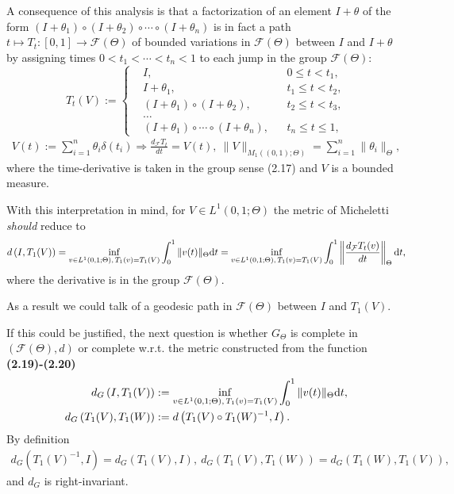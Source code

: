 \documentclass{book}
\numberwithin{equation}{section}
\begin{document}
\begin{enumerate}
    A consequence of this analysis is that a factorization of an element $I + \theta$ of the form $(I + \theta_1)\circ(I + \theta_2)\circ\cdots\circ(I + \theta_n)$ is in fact a path $t\mapsto T_t:[0,1]\to\mathcal{F}(\Theta)$ of bounded variations in $\mathcal{F}(\Theta)$ between $I$ and $I + \theta$ by assigning times $0 < t_1 < \cdots < t_n < 1$ to each jump in the group $\mathcal{F}(\Theta)$:
    \begin{equation*}
        T_t(V) := \left\{\begin{split}
            &I, &&0\le t < t_1,\\
            &I + \theta_1, &&t_1\le t < t_2,\\
            &(I + \theta_1)\circ(I + \theta_2), && t_2\le t < t_3,\\
            &\ldots\\
            &(I + \theta_1)\circ\cdots\circ(I + \theta_n), &&t_n\le t\le 1,
        \end{split}\right.
    \end{equation*}
    \begin{align*}
        V(t) := \sum_{i=1}^n 
        \theta_i\delta(t_i)\Rightarrow\frac{d_{\mathcal{F}}T_t}{dt} = V(t),\ \|V\|_{M_1\left((0,1);\Theta\right)} = \sum_{i=1}^n \|\theta_i\|_\Theta,
    \end{align*}
    where the time-derivative is taken in the group sense (2.17) and $V$ is a bounded measure.
    
    With this interpretation in mind, for $V\in L^1(0,1;\Theta)$ the metric of Micheletti \textit{should} reduce to
    \begin{align*}
        d\left(I,T_1(V)\right) = \inf_{v\in L^1(0,1;\Theta),\,T_1(v) = T_1(V)} \int_0^1 \|v(t)\|_\Theta{\rm d}t = \inf_{v\in L^1(0,1;\Theta),\,T_1(v) = T_1(V)} \int_0^1 \left\|\frac{d_{\mathcal{F}}T_t(v)}{dt}\right\|_\Theta{\rm d}t,
    \end{align*}
    where the derivative is in the group $\mathcal{F}(\Theta)$.
    
    As a result we could talk of a geodesic path in  $\mathcal{F}(\Theta)$ between $I$ and $T_1(V)$.
    
    If this could be justified, the next question is whether $G_\Theta$ is complete in $(\mathcal{F}(\Theta),d)$ or complete w.r.t. the metric constructed from the function \textbf{(2.19)-(2.20)}
    \begin{align*}
        d_G\left(I,T_1(V)\right) &:= \inf_{v\in L^1(0,1;\Theta),\,T_1(v) = T_1(V)} \int_0^1 \|v(t)\|_\Theta{\rm d}t,\\
        d_G\left(T_1(V),T_1(W)\right) &:= d\left(T_1(V)\circ T_1(W)^{-1},I\right).
    \end{align*}
    By definition
    \begin{align*}
        d_G\left(T_1(V)^{-1},I\right) = d_G\left(T_1(V),I\right),\ d_G\left(T_1(V),T_1(W)\right) = d_G\left(T_1(W),T_1(V)\right),
    \end{align*}
    and $d_G$ is right-invariant.
    

\end{enumerate}
\end{document}
